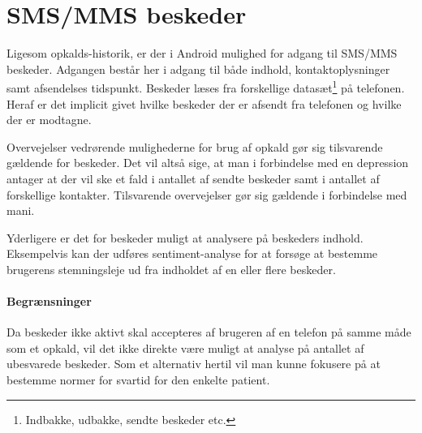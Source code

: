 \section{SMS/MMS beskeder}\label{datasamling:smsmms}
Ligesom opkalds-historik, er der i Android mulighed for adgang til SMS/MMS beskeder.
Adgangen består her i adgang til både indhold, kontaktoplysninger samt afsendelses tidspunkt.
Beskeder læses fra forskellige datasæt\footnote{Indbakke, udbakke, sendte beskeder etc.} på telefonen.
Heraf er det implicit givet hvilke beskeder der er afsendt fra telefonen og hvilke der er modtagne.

Overvejelser vedrørende mulighederne for brug af opkald gør sig tilsvarende gældende for beskeder.
Det vil altså sige, at man i forbindelse med en depression antager at der vil ske et fald i antallet af sendte beskeder samt i antallet af forskellige kontakter.
Tilsvarende overvejelser gør sig gældende i forbindelse med mani.

Yderligere er det for beskeder muligt at analysere på beskeders indhold.
Eksempelvis kan der udføres sentiment-analyse for at forsøge at bestemme brugerens stemningsleje ud fra indholdet af en eller flere beskeder.

\paragraph{Begrænsninger}
Da beskeder ikke aktivt skal accepteres af brugeren af en telefon på samme måde som et opkald, vil det ikke direkte være muligt at analyse på antallet af ubesvarede beskeder.
Som et alternativ hertil vil man kunne fokusere på at bestemme normer for svartid for den enkelte patient.



